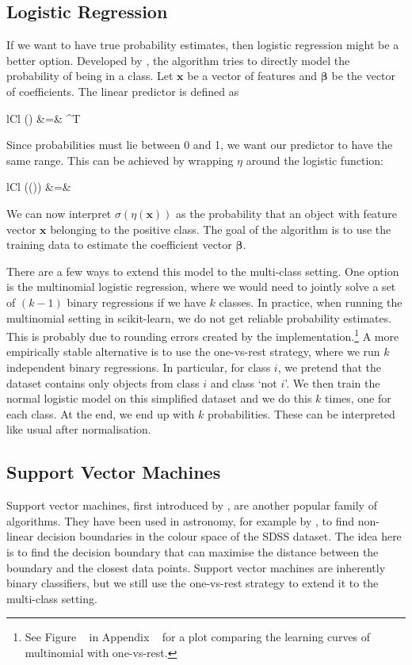 \subsection{Logistic Regression}
If we want to have true probability estimates, then logistic regression might be a better option.
Developed by , the algorithm tries to directly model the probability of 
being in a class. Let $\bm{x}$ be a vector of features and $\bm{\beta}$ be the vector of 
coefficients. The linear predictor is defined as
	\begin{IEEEeqnarray*}{lCl}
		\eta() &=& \bm{\beta}^T 
	\end{IEEEeqnarray*}	
Since probabilities must lie between 0 and 1, we want our predictor to have the same range.
This can be achieved by wrapping $\eta$ around the logistic function:
	\begin{IEEEeqnarray*}{lCl}
		\sigma(\eta()) &=& 
	\end{IEEEeqnarray*}
We can now interpret $\sigma(\eta(\bm{x}))$ as the probability that an object with feature
vector $\bm{x}$ belonging to the positive class. The goal of the algorithm is to use the
training data to estimate the coefficient vector $\bm{\beta}$.

There are a few ways to extend this model to the multi-class setting. One option is
the multinomial logistic regression, where we would need to jointly solve a set of $(k-1)$ 
binary regressions if we have $k$ classes. In practice, when running the multinomial setting
in scikit-learn, we do not get reliable probability estimates. This is probably due
to rounding errors created by the implementation.\footnote{See Figure ~ in
	Appendix ~ for a plot comparing the learning curves of multinomial with one-vs-rest.}
A more empirically stable alternative is to use the one-vs-rest strategy, where we run $k$ 
independent binary regressions. In particular, for class $i$, we pretend that the dataset
contains only objects from class $i$ and class `not $i$'. We then train the normal logistic model
on this simplified dataset and we do this $k$ times, one for each class. At the end, we end up
with $k$ probabilities. These can be interpreted like usual after normalisation.


\subsection{Support Vector Machines}

Support vector machines, first introduced by , are another popular
family of algorithms. They have been used in astronomy, for example by ,
to find non-linear decision boundaries in the colour space of the SDSS dataset. The idea
here is to find the decision boundary that can maximise the distance between the boundary and the
closest data points. Support vector machines are inherently binary classifiers, but
we still use the one-vs-rest strategy to extend it to the multi-class setting.

